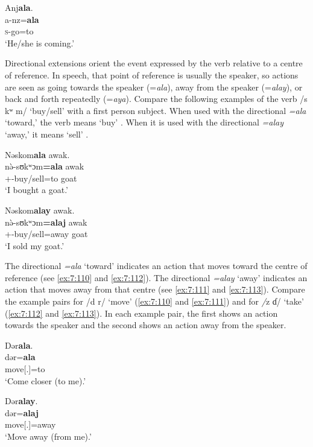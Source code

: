 \ea\label{ex:7:107}
Anj\textbf{ala}.\\
\gll a-nz=\textbf{ala}\\
\textsc{s}-go=to\\
\glt ‘He/she is coming.’  
\z

Directional extensions orient the event expressed by the verb relative to a centre of reference.  In speech, that point of reference is usually the speaker, so actions are seen as going towards the speaker (=\textit{ala}), away from the speaker (=\textit{alay}), or back and forth repeatedly (=\textit{aya}). Compare the following examples of the verb /s kʷ m/ ‘buy/sell’ with a first person subject. When used with the directional \textit{=ala} ‘toward,’ the verb means ‘buy’ . When it is used with the directional \textit{=alay} ‘away,’ it means ‘sell’ .

\ea\label{ex:7:108}
Nəskom\textbf{ala}  awak.\\
\gll  n\`ə-sʊkʷɔm\textbf{=ala}    awak\\
      {\oneS}+{\PFV}-buy/sell=to    goat\\
\glt  ‘I bought a goat.’\\
\z 

\ea\label{ex:7:109}
Nəskom\textbf{alay}  awak.\\
\gll  n\`ə-sʊkʷɔm\textbf{=alaj}  awak\\
      {\oneS}+{\PFV}-buy/sell=away  goat\\
\glt  ‘I sold my goat.’\\
\z 

The directional \textit{=ala} ‘toward’ indicates an action that moves toward the centre of reference (see \ref{ex:7:110} and \ref{ex:7:112}). The directional \textit{=alay} ‘away’ indicates an action that moves away from that centre (see \ref{ex:7:111} and \ref{ex:7:113}). Compare the example pairs for /d r/ ‘move’ (\ref{ex:7:110} and \ref{ex:7:111}) and for \textit{/}z ɗ/ ‘take’ (\ref{ex:7:112} and \ref{ex:7:113}). In each example pair, the first shows an action towards the speaker and the second shows an action away from the speaker. 

\ea\label{ex:7:110}
Dər\textbf{ala}. \\
\gll  dər=\textbf{ala}\\
      move[{\twoS}.{\IMP}]=to\\
\glt  ‘Come closer (to me).’\\
\z 

\ea\label{ex:7:111}
Dər\textbf{alay}.\\
\gll  dər=\textbf{alaj}\\
      move[{\twoS}.{\IMP}]=away\\
\glt  ‘Move away (from me).’\\
\z 

